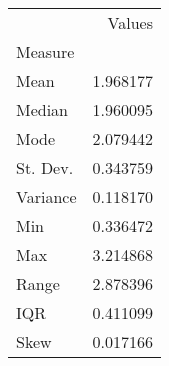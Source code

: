 \begin{tabu}{lr}
\toprule
 & Values \\
Measure &  \\
\midrule
Mean & 1.968177 \\
Median & 1.960095 \\
Mode & 2.079442 \\
St. Dev. & 0.343759 \\
Variance & 0.118170 \\
Min & 0.336472 \\
Max & 3.214868 \\
Range & 2.878396 \\
IQR & 0.411099 \\
Skew & 0.017166 \\
\bottomrule
\end{tabu}
